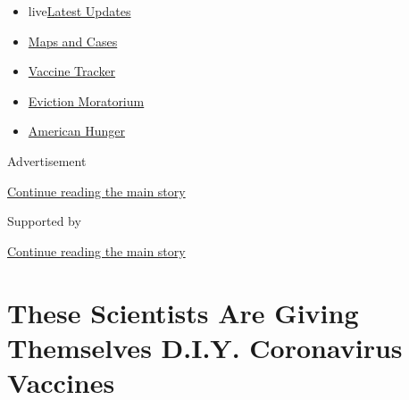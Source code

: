 \begin{itemize}
\tightlist
\item
  live\href{https://www.nytimes3xbfgragh.onion/2020/09/09/world/covid-19-coronavirus.html?name=styln-coronavirus-national\&region=TOP_BANNER\&block=storyline_menu_recirc\&action=click\&pgtype=Article\&impression_id=deaf22d0-f295-11ea-96c9-f92c07a4cad0\&variant=undefined}{Latest
  Updates}
\item
  \href{https://www.nytimes3xbfgragh.onion/interactive/2020/us/coronavirus-us-cases.html?name=styln-coronavirus-national\&region=TOP_BANNER\&block=storyline_menu_recirc\&action=click\&pgtype=Article\&impression_id=deaf22d1-f295-11ea-96c9-f92c07a4cad0\&variant=undefined}{Maps
  and Cases}
\item
  \href{https://www.nytimes3xbfgragh.onion/interactive/2020/science/coronavirus-vaccine-tracker.html?name=styln-coronavirus-national\&region=TOP_BANNER\&block=storyline_menu_recirc\&action=click\&pgtype=Article\&impression_id=deaf22d2-f295-11ea-96c9-f92c07a4cad0\&variant=undefined}{Vaccine
  Tracker}
\item
  \href{https://www.nytimes3xbfgragh.onion/2020/09/02/your-money/eviction-moratorium-covid.html?name=styln-coronavirus-national\&region=TOP_BANNER\&block=storyline_menu_recirc\&action=click\&pgtype=Article\&impression_id=deaf22d3-f295-11ea-96c9-f92c07a4cad0\&variant=undefined}{Eviction
  Moratorium}
\item
  \href{https://www.nytimes3xbfgragh.onion/interactive/2020/09/02/magazine/food-insecurity-hunger-us.html?name=styln-coronavirus-national\&region=TOP_BANNER\&block=storyline_menu_recirc\&action=click\&pgtype=Article\&impression_id=deaf22d4-f295-11ea-96c9-f92c07a4cad0\&variant=undefined}{American
  Hunger}
\end{itemize}

Advertisement

\protect\hyperlink{after-top}{Continue reading the main story}

Supported by

\protect\hyperlink{after-sponsor}{Continue reading the main story}

\hypertarget{these-scientists-are-giving-themselves-diy-coronavirus-vaccines}{%
\section{These Scientists Are Giving Themselves D.I.Y. Coronavirus
Vaccines}\label{these-scientists-are-giving-themselves-diy-coronavirus-vaccines}}


